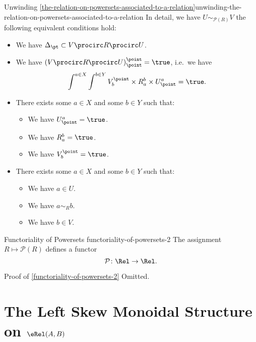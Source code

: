 \begin{remark}{Unwinding \cref{the-relation-on-powersets-associated-to-a-relation}}{unwinding-the-relation-on-powersets-associated-to-a-relation}%
    In detail, we have $U\sim_{\mathcal{P}(R)}V$ \textiff the following equivalent conditions hold:
    \begin{itemize}
        \item We have $\Delta_{\pt}\subset V\procirc R\procirc U$.
        \item We have $(V\procirc R\procirc U)^{\point}_{\point}=\true$, i.e.\ we have
            \[
                \int^{a\in X}\int^{b\in Y}V^{\point}_{b}\times R^{b}_{a}\times U^{a}_{\point}%
                =%
                \true.%
            \]%
        \item There exists some $a\in X$ and some $b\in Y$ such that:
            \begin{itemize}
                \item We have $U^{a}_{\point}=\true$.
                \item We have $R^{b}_{a}=\true$.
                \item We have $V^{\point}_{b}=\true$.
            \end{itemize}
        \item There exists some $a\in X$ and some $b\in Y$ such that:
            \begin{itemize}
                \item We have $a\in U$.
                \item We have $a\sim_{R}b$.
                \item We have $b\in V$.
            \end{itemize}
    \end{itemize}
\end{remark}
\begin{proposition}{Functoriality of Powersets \rmII}{functoriality-of-powersets-2}%
    The assignment $R\mapsto\mathcal{P}(R)$ defines a functor
    \[
        \mathcal{P}%
        \colon%
        \Rel%
        \to%
        \Rel.
    \]%
\end{proposition}
\begin{Proof}{Proof of \cref{functoriality-of-powersets-2}}%
    Omitted.
\end{Proof}
\section{The Left Skew Monoidal Structure on $\eRel(A,B)$}\label{section-the-left-skew-monoidal-structure-on-rel-a-b}
